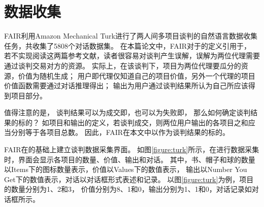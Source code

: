 \section{数据收集}
\label{section:data_collection}

FAIR利用Amazon Mechanical Turk进行了两人间多项目谈判的自然语言数据收集任务，共收集了5808个对话数据集。
在本篇论文中，FAIR对于的定义引用于\citet{Fershtman-4,DevaultMell-5}，
若不实现阅读这两篇参考文献，读者很容易对谈判产生误解，误解为两位代理需要通过谈判交易对方的资源。
实际上，在该谈判下，项目为两位代理要瓜分的资源，价值为随机生成；
用户即代理仅知道自己的项目价值，另外一个代理的项目价值函数需要通过对话推理得出；
输出为用户通过谈判结果所认为自己所应该得到项目部分。

值得注意的是，
谈判结果可以为成交即，也可以为失败即，
那么如何确定谈判结果的标的？
如项目和输出的定义，若谈判成交，则两位用户输出的各项目之和应当分别等于各项目总数。
因此，FAIR在本文中以作为谈判结果的标的。


FAIR在\citet{DasKottur-6}的基础上建立谈判数据采集界面。
如图\ref{figure:turk}所示，在进行数据采集时，界面会显示各项目的数量、价值、输出和对话。
其中，书、帽子和球的数量以Items下的图标数量表示，价值以Values下的数值表示，
输出以Number You Get下的数值表示，对话以对话框形式表述和记录。
以图\ref{figure:turk}为例，项目的数量分别为1、2和3，
价值分别为8、1和0，输出分别为1、1和0，对话记录如对话框所示。